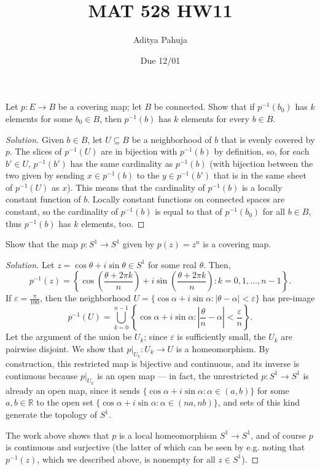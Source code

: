 \documentclass[10pt]{article}
\title{MAT 528 HW11}
\author{\large Aditya Pahuja}
\date{\large Due 12/01}
\providecommand{\eps}{\varepsilon}
\providecommand{\RR}{\mathbb R}
\providecommand{\inv}{^{-1}}
\newenvironment{soln}{\begin{proof}[Solution]}{\end{proof}}
\providecommand{\abs}[1]{\left\lvert #1\right\rvert}
\begin{document}
\maketitle

\begin{problem}
    [Munkres 53.3]
    Let $p\colon E\to B$ be a covering map; let $B$ be connected.
    Show that if $p\inv(b_0)$ has $k$ elements for some $b_0\in B$,
    then $p\inv(b)$ has $k$ elements for every $b\in B$.
\end{problem}

\begin{soln}
    Given $b\in B$, let $U\subseteq B$ be a neighborhood of $b$
    that is evenly covered by $p$. The slices of $p\inv(U)$
    are in bijection with $p\inv(b)$ by definition,
    so, for each $b'\in U$, $p\inv(b')$ has the same cardinality
    as $p\inv(b)$ (with bijection between the two
    given by sending $x\in p\inv(b)$ to the $y\in p\inv(b')$
    that is in the same sheet of $p\inv(U)$ as $x$).
    This means that the cardinality of $p\inv(b)$
    is a locally constant function of $b$.
    Locally constant functions on connected spaces are constant,
    so the cardinality of $p\inv(b)$ is equal to
    that of $p\inv(b_0)$ for all $b\in B$,
    thus $p\inv(b)$ has $k$ elements, too.
\end{soln}

\begin{problem}
    [Munkres 53.5]
    Show that the map $p\colon S^1\to S^1$ given by $p(z) = z^n$
    is a covering map.
\end{problem}

\begin{soln}
    Let $z = \cos\theta + i\sin\theta\in S^1$ for some real $\theta$. Then,
    \[
	p\inv(z) = \left\{
	    \cos\left(\frac{\theta+2\pi k}n\right)
	    + i\sin\left(\frac{\theta+2\pi k}n\right) : k=0,1,\dots,n-1
	\right\}.
    \]
    If $\eps = \frac{\pi}{100}$, then the neighborhood
    $U = \{\cos\alpha + i\sin\alpha : \abs{\theta-\alpha} < \eps\}$
    has pre-image
    \begin{equation*}
        p\inv(U) =
	\bigcup_{k=0}^{n-1} \left\{\cos\alpha + i\sin\alpha :
	\abs{\frac\theta n - \alpha} < \frac\eps n\right\}.
    \end{equation*}
    Let the argument of the union be $U_k$;
    since $\eps$ is sufficiently small, the $U_k$ are pairwise disjoint.
    We show that $p|_{U_k}\colon U_k\to U$ is a homeomorphism.
    By construction, this restricted map is bijective and continuous,
    and its inverse is continuous because $p|_{U_k}$ is
    an open map --- in fact, the unrestricted $p\colon S^1\to S^1$
    is already an open map, since it sends
    $\{\cos\alpha + i\sin\alpha : \alpha\in (a,b)\}$ for some $a,b\in\RR$
    to the open set $\{\cos\alpha + i\sin\alpha : \alpha\in(na,nb)\}$,
    and sets of this kind generate the topology of $S^1$.

    The work above shows that $p$ is a local homeomorphism $S^1\to S^1$,
    and of course $p$ is continuous and surjective
    (the latter of which can be seen by e.g. noting that $p\inv(z)$,
    which we described above, is nonempty for all $z\in S^1$).
\end{soln}
\end{document}
